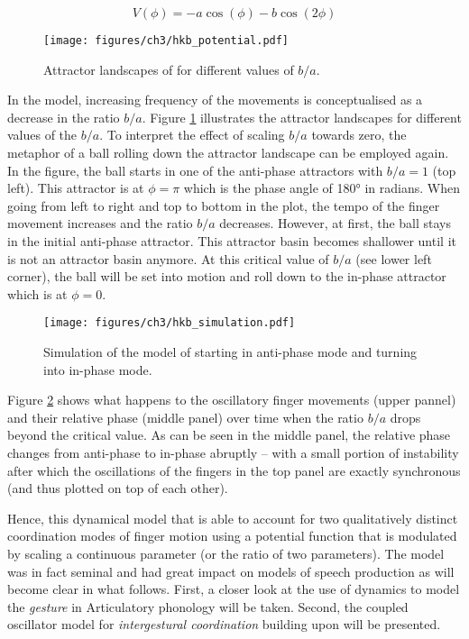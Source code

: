 \begin{equation}
V(\phi) = -a \cos(\phi) - b \cos( 2 \phi)
\label{eq:hkb_potential}
\end{equation}

\begin{figure}[b]
	\texttt{[image: figures/ch3/hkb\_potential.pdf]}
	\caption{Attractor landscapes of \citet{HakenKelsoBunz1985} for different values of $b/a$.}
	\label{fig:hkb_landscapes}
	
\end{figure}

In the model, increasing frequency of the movements is conceptualised as a decrease in the ratio $b/a$. Figure \ref{fig:hkb_landscapes} illustrates the attractor landscapes for different values of the $b/a$. To interpret the effect of scaling $b/a$ towards zero, the metaphor of a ball rolling down the attractor landscape can be employed again. In the figure, the ball starts in one of the anti-phase attractors with $b/a = 1$ (top left). This attractor is at $\phi = \pi$ which is the phase angle of 180° in radians. When going from left to right and top to bottom in the plot, the tempo of the finger movement increases and the ratio $b/a$ decreases. However, at first, the ball stays in the initial anti-phase attractor. This attractor basin becomes shallower until it is not an attractor basin anymore. At this critical value of $b/a$ (see lower left corner), the ball will be set into motion and roll down to the in-phase attractor which is at $\phi = 0$.

\begin{figure}[b]
	\texttt{[image: figures/ch3/hkb\_simulation.pdf]}
	\caption{Simulation of the model of \citet{HakenKelsoBunz1985} starting in anti-phase mode and turning into in-phase mode.}
	\label{fig:hkb_simulation}
\end{figure}


Figure \ref{fig:hkb_simulation} shows what happens to the oscillatory finger movements (upper pannel)  and their relative phase (middle panel) over time when the ratio $b/a$ drops beyond the critical value. As can be seen in the middle panel, the relative phase changes from anti-phase to in-phase abruptly -- with a small portion of instability after which the oscillations of the fingers in the top panel are exactly synchronous (and thus plotted on top of each other).

Hence, this dynamical model that is able to account for two qualitatively distinct coordination modes of finger motion using a potential function that is modulated by scaling a continuous parameter (or the ratio of two parameters). The model was in fact seminal and had great impact on models of speech production as will become clear in what follows. First, a closer look at the use of dynamics to model the \emph{gesture} in Articulatory phonology will be taken. Second, the coupled oscillator model for \emph{intergestural coordination} building upon \citet{HakenKelsoBunz1985} will be presented.


